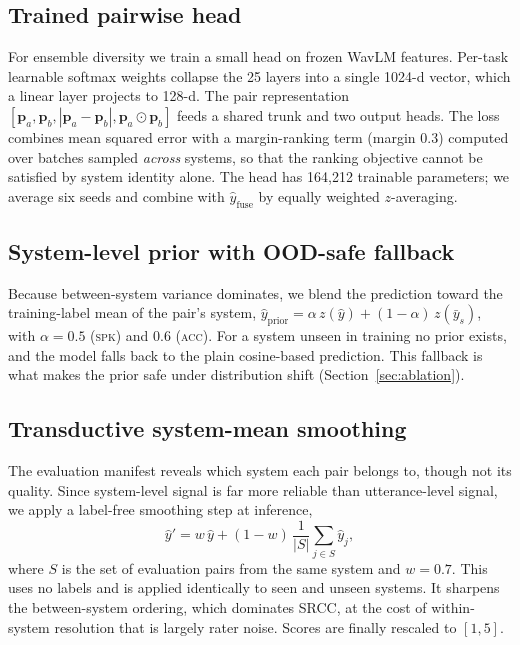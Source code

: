 \documentclass{article}
\begin{document}
\subsection{Trained pairwise head}

For ensemble diversity we train a small head on frozen WavLM features. Per-task
learnable softmax weights collapse the 25 layers into a single 1024-d vector,
which a linear layer projects to 128-d. The pair representation
$[\mathbf{p}_a, \mathbf{p}_b, |\mathbf{p}_a - \mathbf{p}_b|,
\mathbf{p}_a \odot \mathbf{p}_b]$ feeds a shared trunk and two output heads. The
loss combines mean squared error with a margin-ranking term (margin $0.3$)
computed over batches sampled \emph{across} systems, so that the ranking
objective cannot be satisfied by system identity alone. The head has 164{,}212
trainable parameters; we average six seeds and combine with
$\hat{y}_{\text{fuse}}$ by equally weighted $z$-averaging.

\subsection{System-level prior with OOD-safe fallback}

Because between-system variance dominates, we blend the prediction toward the
training-label mean of the pair's system,
$\hat{y}_{\text{prior}} = \alpha\, z(\hat{y}) + (1-\alpha)\, z(\bar{y}_{s})$,
with $\alpha=0.5$ (\textsc{spk}) and $0.6$ (\textsc{acc}). For a system unseen in
training no prior exists, and the model falls back to the plain cosine-based
prediction. This fallback is what makes the prior safe under distribution shift
(Section~\ref{sec:ablation}).

\subsection{Transductive system-mean smoothing}

The evaluation manifest reveals which system each pair belongs to, though not its
quality. Since system-level signal is far more reliable than utterance-level
signal, we apply a label-free smoothing step at inference,
\begin{equation}
  \hat{y}' = w\,\hat{y} + (1-w)\,\frac{1}{|S|}\sum_{j \in S} \hat{y}_j ,
  \label{eq:smooth}
\end{equation}
where $S$ is the set of evaluation pairs from the same system and $w=0.7$. This
uses no labels and is applied identically to seen and unseen systems. It
sharpens the between-system ordering, which dominates SRCC, at the cost of
within-system resolution that is largely rater noise. Scores are finally rescaled
to $[1,5]$.
\end{document}
